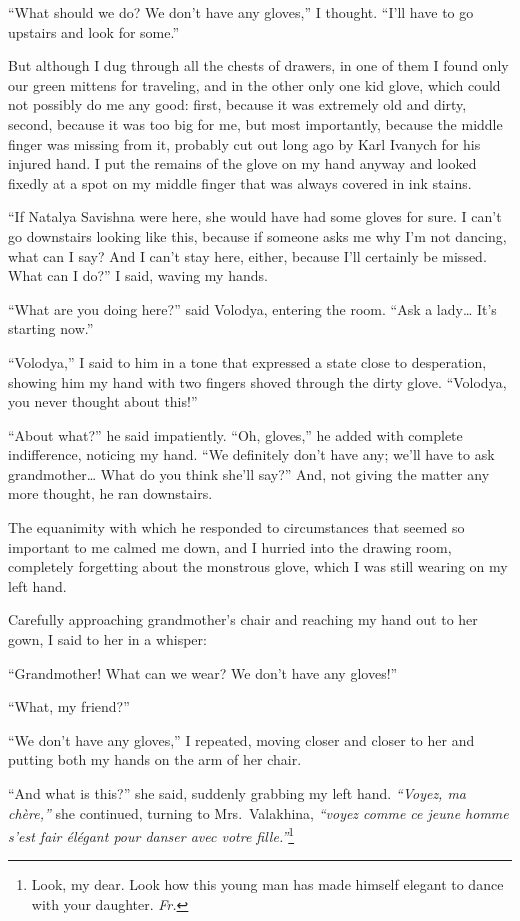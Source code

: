 ``What should we do? We don't have any gloves,'' I thought. ``I'll have to go upstairs and look for some.'' %

But although I dug through all the chests of drawers, in one of them I found only our green mittens for traveling, and in the other only one kid glove, which could not possibly do me any good: first, because it was extremely old and dirty, second, because it was too big for me, but most importantly, because the middle finger was missing from it, probably cut out long ago by Karl Ivanych for his injured hand. I put the remains of the glove on my hand anyway and looked fixedly at a spot on my middle finger that was always covered in ink stains.

``If Natalya Savishna were here, she would have had some gloves for sure. I can't go downstairs looking like this, because if someone asks me why I'm not dancing, what can I say? And I can't stay here, either, because I'll certainly be missed. What can I do?'' I said, waving my hands. %

``What are you doing here?'' said Volodya, entering the room. ``Ask a lady\ldots{} It's starting now.'' %

``Volodya,'' I said to him in a tone that expressed a state close to desperation, showing him my hand with two fingers shoved through the dirty glove. ``Volodya, you never thought about this!'' %

``About what?'' he said impatiently. ``Oh, gloves,'' he added with complete indifference, noticing my hand. ``We definitely don't have any; we'll have to ask grandmother\ldots{} What do you think she'll say?'' And, not giving the matter any more thought, he ran downstairs. %

The equanimity with which he responded to circumstances that seemed so important to me calmed me down, and I hurried into the drawing room, completely forgetting about the monstrous glove, which I was still wearing on my left hand.

Carefully approaching grandmother's chair and reaching my hand out to her gown, I said to her in a whisper:

``Grandmother! What can we wear? We don't have any gloves!'' %

``What, my friend?'' %

``We don't have any gloves,'' I repeated, moving closer and closer to her and putting both my hands on the arm of her chair.

``And what is this?'' she said, suddenly grabbing my left hand. \textit{``Voyez, ma ch\`ere,''} she continued, turning to Mrs.~Valakhina, \textit{``voyez comme ce jeune homme s'est fair \'el\'egant pour danser avec votre fille.''}\footnote{Look, my dear. Look how this young man has made himself elegant to dance with your daughter. \textit{Fr.}} %

